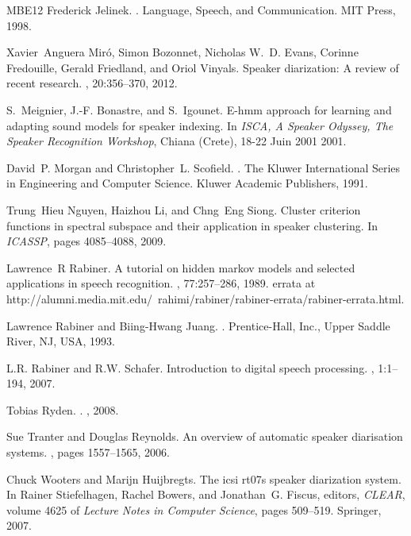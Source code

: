 \begin{thebibliography}{MBE{\etalchar{+}}12}
Frederick Jelinek.
.
\newblock Language, Speech, and Communication. MIT Press, 1998.

Xavier~Anguera Miró, Simon Bozonnet, Nicholas W.~D. Evans, Corinne Fredouille,
  Gerald Friedland, and Oriol Vinyals.
\newblock Speaker diarization: A review of recent research.
,
  20:356--370, 2012.

S.~Meignier, J.-F. Bonastre, and S.~Igounet.
\newblock E-hmm approach for learning and adapting sound models for speaker
  indexing.
\newblock In {\em ISCA, A Speaker Odyssey, The Speaker Recognition Workshop},
  Chiana (Crete), 18-22 Juin 2001 2001.

David~P. Morgan and Christopher~L. Scofield.
.
\newblock The Kluwer International Series in Engineering and Computer Science.
  Kluwer Academic Publishers, 1991.

Trung~Hieu Nguyen, Haizhou Li, and Chng~Eng Siong.
\newblock Cluster criterion functions in spectral subspace and their
  application in speaker clustering.
\newblock In {\em ICASSP}, pages 4085--4088, 2009.

Lawrence~R Rabiner.
\newblock A tutorial on hidden markov models and selected applications in
  speech recognition.
, 77:257--286, 1989.
\newblock errata at
  http://alumni.media.mit.edu/~rahimi/rabiner/rabiner-errata/rabiner-errata.html.

Lawrence Rabiner and Biing-Hwang Juang.
.
\newblock Prentice-Hall, Inc., Upper Saddle River, NJ, USA, 1993.

L.R. Rabiner and R.W. Schafer.
\newblock Introduction to digital speech processing.
, 1:1--194, 2007.

Tobias Ryden.
.
, 2008.

Sue Tranter and Douglas Reynolds.
\newblock An overview of automatic speaker diarisation systems.
, pages 1557--1565, 2006.

Chuck Wooters and Marijn Huijbregts.
\newblock The icsi rt07s speaker diarization system.
\newblock In Rainer Stiefelhagen, Rachel Bowers, and Jonathan~G. Fiscus,
  editors, {\em CLEAR}, volume 4625 of {\em Lecture Notes in Computer Science},
  pages 509--519. Springer, 2007.

\end{thebibliography}

